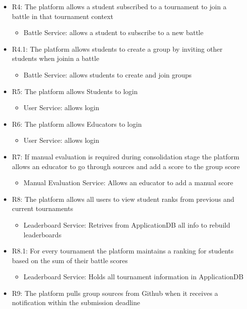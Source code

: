 \begin{itemize}
\item R4:	The platform allows a student subscribed to a tournament to join a battle in that tournament context
\begin{itemize}
\item Battle Service: allows a student to subscribe to a new battle
\end{itemize}
\item R4.1: The platform allows students to create a group by inviting other students when joinin a battle
\begin{itemize}
\item Battle Service: allows students to create and join groups
\end{itemize}
\item R5:	The platform allows Students to login
\begin{itemize}
\item User Service: allows login
\end{itemize}
\item R6: The platform allows Educators to login
\begin{itemize}
\item User Service: allows login
\end{itemize}
\item R7: If manual evaluation is required during consolidation stage the platform allows an educator to go through sources and add a score to the group score
\begin{itemize}
\item Manual Evaluation Service: Allows an educator to add a manual score
\end{itemize}
\item R8: The platform allows all users to view student ranks from previous and current tournaments
\begin{itemize}
\item Leaderboard Service: Retrives from ApplicationDB all info to rebuild leaderboards
\end{itemize}
\item R8.1: For every tournament the platform maintains a ranking for students based on the sum of their battle scores
\begin{itemize}
\item Leaderboard Service: Holds all tournament information in ApplicationDB
\end{itemize}
\item R9: The platform pulls group sources from Github when it receives a notification within the submission deadline

\end{itemize}
